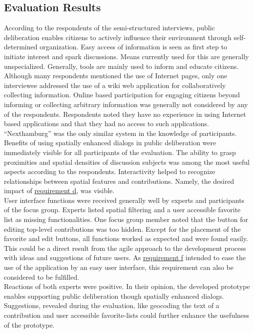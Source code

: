 \subsection{Evaluation Results}
\label{sub:evaluation-results}
According to the respondents of the semi-structured interviews, public deliberation enables citizens to actively influence their environment through self-determined organization. Easy access of information is seen as first step to initiate interest and spark discussions. Means currently used for this are generally unspecialized. Generally, tools are mainly used to inform and educate citizens. Although many respondents mentioned the use of Internet pages, only one interviewee addressed the use of a wiki web application for collaboratively collecting information. Online based participation for engaging citizens beyond informing or collecting arbitrary information was generally not considered by any of the respondents. Respondents noted they have no experience in using Internet based applications and that they had no access to such applications. ``Nexthamburg'' was the only similar system in the knowledge of participants.\\
Benefits of using spatially enhanced dialogs in public deliberation were immediately visible for all participants of the evaluation. The ability to grasp proximities and spatial densities of discussion subjects was among the most useful aspects according to the respondents. Interactivity helped to recognize relationships between spatial features and contributions. Namely, the desired impact of \hyperref[req:d]{requirement d}, was visible.\\
User interface functions were received generally well by experts and participants of the focus group. Experts listed spatial filtering and a user accessible favorite list as missing functionalities. One focus group member noted that the button for editing top-level contributions was too hidden. Except for the placement of the favorite and edit buttons, all functions worked as expected and were found easily. This could be a direct result from the agile approach to the development process with ideas and suggestions of future users. As \hyperref[req:f]{requirement f} intended to ease the use of the application by an easy user interface, this requirement can also be considered to be fulfilled.\\
Reactions of both experts were positive. In their opinion, the developed prototype enables supporting public deliberation though spatially enhanced dialogs. Suggestions, revealed during the evaluation, like geocoding the text of a contribution and user accessible favorite-lists could further enhance the usefulness of the prototype.\\
